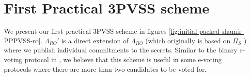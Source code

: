 % 

\section{First Practical 3PVSS scheme}
\label{sec:practical-3PVSS}
We present our first practical 3PVSS scheme in figures \ref{fig:initial-packed-shamir-PPPVSS-ro}. $\Lambda_{RO}'$ is a 
direct extension of $\Lambda_{RO}$ \cite{cryptoeprint:2025/576} 
(which originally is based on $\Pi_S$ \cite{cryptoeprint:2023/1669}) where we publish 
individual commitments to the secrets. Similar to the binary e-voting protocol in 
\cite{cryptoeprint:2025/576}, we believe that this scheme is useful in some 
e-voting protocols where there are more than two candidates to be voted for.

% 

% 

